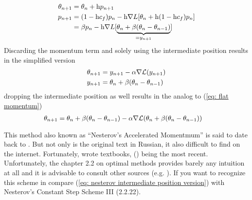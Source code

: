\begin{definition}
	\label{def: nesterov's momentum}
	\begin{subequations}
	\begin{align}
		\theta_{n+1} &= \theta_n + \text{h} p_{n+1} \label{eq: nesterov momentum move}\\
		p_{n+1}
		&= (1-\text{h}c_f)p_n
		- \text{h}\nabla L[\theta_n + \text{h}(1-\text{h}c_f)p_n]
		\label{eq: nesterov momentum}
		\\ \nonumber
		&= \beta p_n
		- \text{h}\nabla L[\underbrace{
			\theta_n + \beta(\theta_n - \theta_{n-1})
		}_{= y_{n+1}}]
	\end{align}
	\end{subequations}
	Discarding the momentum term and solely using the intermediate position
	results in the simplified version
	\begin{subequations} \label{eq: nesterov intermediate position version}
	\begin{align}
		\theta_{n+1} &= y_{n+1} - \alpha \nabla \mathcal{L}(y_{n+1})\\
		y_{n+1}&= \theta_n + \beta(\theta_n - \theta_{n-1})
	\end{align}
	\end{subequations}
	dropping the intermediate position as well results in the analog to (\ref{eq:
	flat momentum})
	\begin{align}
		\theta_{n+1} &= \theta_n + \beta(\theta_n - \theta_{n-1})
		- \alpha \nabla \mathcal{L}(\theta_n + \beta(\theta_n - \theta_{n-1}))
	\end{align}
\end{definition}
%
\begin{remark}
	This method also known as ``Nesterov's Accelerated Momentmum'' is said to date
	back to \textcite{nesterovMethodSolvingConvex1983}.  But not only is the
	original text in Russian, it also difficult to find on the internet.
	Fortunately, \citeauthor{nesterovMethodSolvingConvex1983} wrote textbooks,
	(\citeyear{nesterovLecturesConvexOptimization2018}) being the most recent.
	Unfortunately, the chapter 2.2 on optimal methods provides barely any
	intuition at all and it is advisable to consult other sources (e.g.
	\textcite{dontlooWhatDifferenceMomentum2016}). If you
	want to recognize this scheme in \textcite{nesterovLecturesConvexOptimization2018}
	compare (\ref{eq: nesterov intermediate position version}) with Nesterov's
	Constant Step Scheme III (2.2.22).
 \end{remark}

